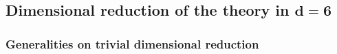 


\subsection[Dimensional reduction of the theory in \texorpdfstring{${ d=6}$}{d=6} ]{Dimensional reduction of the theory in \texorpdfstring{$\boldsymbol{ d=6}$}{d=6} }

\subsubsection{Generalities on trivial dimensional reduction }

